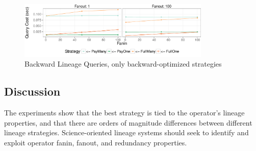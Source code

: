\begin{figure}[htb]
    \includegraphics[width=3.6in,natwidth=10in,natheight=3in]{figures/microbench/query_back.pdf}
\caption{Backward Lineage Queries, only backward-optimized strategies}
\label{f:micro_query}
\end{figure}











\subsection{Discussion}

The experiments show that the best strategy is tied to the
operator's lineage properties, and that there are orders of magnitude
differences between different lineage strategies.   Science-oriented lineage
systems should seek to identify and exploit operator fanin, fanout, and
redundancy properties.

